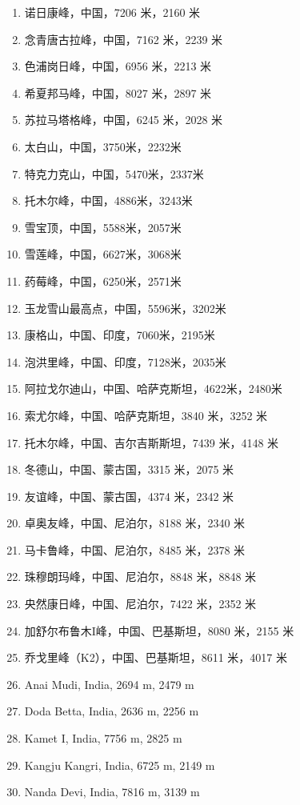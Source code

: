 \documentclass[10pt,twocolumn,letterpaper]{article}
\begin{document}
\begin{flushleft}
\begin{enumerate}
    \item 诺日康峰，中国，7206 米，2160 米
    \item 念青唐古拉峰，中国，7162 米，2239 米
    \item 色浦岗日峰，中国，6956 米，2213 米
    \item 希夏邦马峰，中国，8027 米，2897 米
    \item 苏拉马塔格峰，中国，6245 米，2028 米
    \item 太白山，中国，3750米，2232米
    \item 特克力克山，中国，5470米，2337米
    \item 托木尔峰，中国，4886米，3243米
    \item 雪宝顶，中国，5588米，2057米
    \item 雪莲峰，中国，6627米，3068米
    \item 药莓峰，中国，6250米，2571米
    \item 玉龙雪山最高点，中国，5596米，3202米
    \item 康格山，中国、印度，7060米，2195米
    \item 泡洪里峰，中国、印度，7128米，2035米
    \item 阿拉戈尔迪山，中国、哈萨克斯坦，4622米，2480米
    \item 索尤尔峰，中国、哈萨克斯坦，3840 米，3252 米
    \item 托木尔峰，中国、吉尔吉斯斯坦，7439 米，4148 米
    \item 冬德山，中国、蒙古国，3315 米，2075 米
    \item 友谊峰，中国、蒙古国，4374 米，2342 米
    \item 卓奥友峰，中国、尼泊尔，8188 米，2340 米
    \item 马卡鲁峰，中国、尼泊尔，8485 米，2378 米
    \item 珠穆朗玛峰，中国、尼泊尔，8848 米，8848 米
    \item 央然康日峰，中国、尼泊尔，7422 米，2352 米
    \item 加舒尔布鲁木I峰，中国、巴基斯坦，8080 米，2155 米
    \item 乔戈里峰（K2），中国、巴基斯坦，8611 米，4017 米
    \item Anai Mudi, India, 2694 m, 2479 m
    \item Doda Betta, India, 2636 m, 2256 m
    \item Kamet I, India, 7756 m, 2825 m
    \item Kangju Kangri, India, 6725 m, 2149 m
    \item Nanda Devi, India, 7816 m, 3139 m

\end{enumerate}
\end{flushleft}
\end{document}
